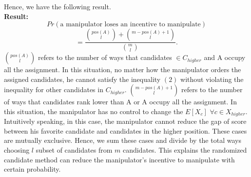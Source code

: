 \documentclass[letterpaper]{article} %
\begin{document}
Hence, we have the following result.\\
\textbf{Result:}
$$Pr(\text{a manipulator loses an incentive to manipulate})$$
\begin{equation}
 = \frac{\binom{pos(A)}{l}+\binom{m-pos(A)+1}{l}}{\binom{m}{l}}.
\end{equation}
$\binom{pos(A)}{l}$ refers to the number of ways that candidates $\in C_{higher}$ and A occupy all the assignment. In this situation, no matter how the manipulator orders the assigned candidates, he cannot satisfy the inequality $(2)$ without violating the inequality for other candidates in $C_{higher}$.
$\binom{m-pos(A)+1}{l}$ refers to the number of ways that candidates rank lower than A or A occupy all the assignment. In this situation, the manipulator has no control to change the $E[X_c]$ $\forall c \in X_{higher}$. Intuitively speaking, in this case, the manipulator cannot reduce the gap of score between his favorite candidate and candidates in the higher position. These cases are mutually exclusive. Hence, we sum these cases and divide by the total ways choosing $l$ subset of candidates from $m$ candidates. This explains the randomized candidate method can reduce the manipulator’s incentive to manipulate with certain probability. 
\end{document}
